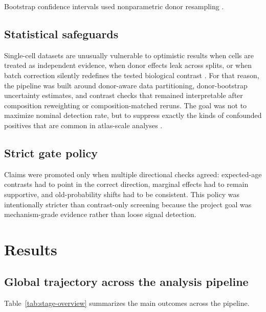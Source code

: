 \documentclass[11pt]{article}
\begin{document}
Bootstrap confidence intervals used nonparametric donor resampling \citep{efron1979bootstrap}.

\subsection{Statistical safeguards}
Single-cell datasets are unusually vulnerable to optimistic results when cells are treated as independent evidence, when donor effects leak across splits, or when batch correction silently redefines the tested biological contrast \citep{crowell2020muscat,zimmerman2021pseudoreplication,squair2021false}. For that reason, the pipeline was built around donor-aware data partitioning, donor-bootstrap uncertainty estimates, and contrast checks that remained interpretable after composition reweighting or composition-matched reruns. The goal was not to maximize nominal detection rate, but to suppress exactly the kinds of confounded positives that are common in atlas-scale analyses \citep{luecken2019bestpractices,tran2020batch,hicks2018missing}.

\subsection{Strict gate policy}
Claims were promoted only when multiple directional checks agreed: expected-age contrasts had to point in the correct direction, marginal effects had to remain supportive, and old-probability shifts had to be consistent. This policy was intentionally stricter than contrast-only screening because the project goal was mechanism-grade evidence rather than loose signal detection.

\section{Results}
\subsection{Global trajectory across the analysis pipeline}
Table~\ref{tab:stage-overview} summarizes the main outcomes across the pipeline.
\end{document}
